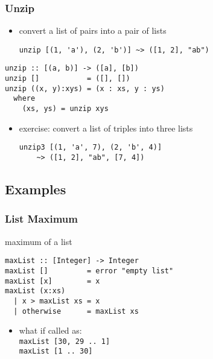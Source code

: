 \documentclass[dvipsnames]{beamer}
\theoremstyle{plain}
\begin{document}
\begin{frame}[fragile]
  \frametitle{Unzip}

  \begin{itemize}
    \item convert a list of pairs into a pair of lists
    \begin{lstlisting}[frame=none]
unzip [(1, 'a'), (2, 'b')] ~> ([1, 2], "ab")
    \end{lstlisting}
  \end{itemize}

  \pause
  \begin{exampleblock}{}
    \begin{lstlisting}[deletekeywords={unzip}]
unzip :: [(a, b)] -> ([a], [b])
unzip []           = ([], [])
unzip ((x, y):xys) = (x : xs, y : ys)
  where
    (xs, ys) = unzip xys
    \end{lstlisting}
  \end{exampleblock}

  \pause
  \begin{itemize}
    \item exercise: convert a list of triples into three lists
    \begin{lstlisting}[frame=none]
unzip3 [(1, 'a', 7), (2, 'b', 4)]
    ~> ([1, 2], "ab", [7, 4])
    \end{lstlisting}
  \end{itemize}
\end{frame}


\subsection{Examples}

\begin{frame}[fragile]
  \frametitle{List Maximum}

  \begin{exampleblock}{maximum of a list}
    \begin{lstlisting}
maxList :: [Integer] -> Integer
maxList []         = error "empty list"
maxList [x]        = x
maxList (x:xs)
  | x > maxList xs = x
  | otherwise      = maxList xs
    \end{lstlisting}
  \end{exampleblock}

  \pause
  \begin{itemize}
    \item what if called as:\\
      \lstinline|maxList [30, 29 .. 1]|\\
      \lstinline|maxList [1 .. 30]|
  \end{itemize}
\end{frame}
\end{document}
